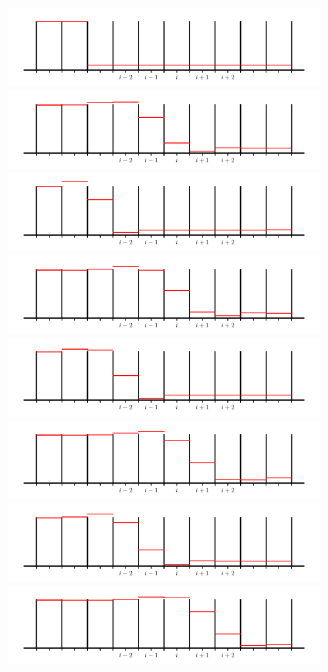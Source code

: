 \documentclass[11pt]{article}
\begin{document}
\begin{figure}[p!]
\centering
\includegraphics[width=3.25in]{rea-nolimit-start_001}\hspace{1em}
\includegraphics[width=3.25in]{rea-nolimit-start_005} \\
\includegraphics[width=3.25in]{rea-nolimit-start_002}\hspace{1em}
\includegraphics[width=3.25in]{rea-nolimit-start_006} \\
\includegraphics[width=3.25in]{rea-nolimit-start_003}\hspace{1em}
\includegraphics[width=3.25in]{rea-nolimit-start_007} \\
\includegraphics[width=3.25in]{rea-nolimit-start_004}\hspace{1em}
\includegraphics[width=3.25in]{rea-nolimit-start_008} \\

\end{figure}
\end{document}
